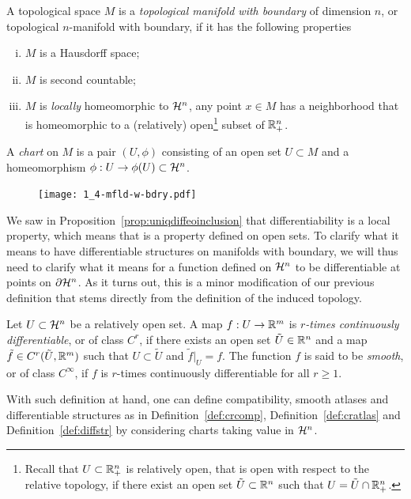 \begin{definition}
  A topological space $M$ is a \emph{topological manifold with boundary} of dimension $n$, or topological $n$-manifold with boundary, if it has the following properties
  \begin{enumerate}[(i)]
    \item $M$ is a Hausdorff space;
    \item $M$ is second countable;
    \item $M$ is \emph{locally} homeomorphic to $\mathcal{H}^n$, any point $x\in M$ has a neighborhood that is homeomorphic to a (relatively) open\footnote{Recall that $U\subset\mathbb{R}^n_+$ is relatively open, that is open with respect to the relative topology, if there exist an open set $\tilde U\subset\mathbb{R}^n$ such that $U = \tilde U \cap \mathbb{R}^n_+$.} subset of $\mathbb{R}^n_+$.
  \end{enumerate}

  A \emph{chart} on $M$ is a pair $(U, \phi)$ consisting of an open set $U\subset M$ and a homeomorphism $\phi: U \to \phi(U)\subset \mathcal{H}^n$.
\end{definition}

\begin{figure}
  \texttt{[image: 1\_4-mfld-w-bdry.pdf]}
\end{figure}

We saw in Proposition~\ref{prop:uniqdiffeoinclusion} that differentiability is a local property, which means that is a property defined on open sets.
To clarify what it means to have differentiable structures on manifolds with boundary, we will thus need to clarify what it means for a function defined on $\mathcal{H}^n$ to be differentiable at points on $\partial\mathcal{H}^n$.
As it turns out, this is a minor modification of our previous definition that stems directly from the definition of the induced topology.

\begin{definition}
  Let $U\subset\mathcal{H}^n$ be a relatively open set. A map $f: U\to\mathbb{R}^m$ is \emph{$r$-times continuously differentiable}, or of class $C^r$, if there exists an open set $\tilde U\in\mathbb{R}^n$ and a map $\tilde f\in C^r(\tilde U, \mathbb{R}^m)$ such that $U\subset\tilde U$ and $\tilde f|_U = f$.
  The function $f$ is said to be \emph{smooth}, or of class $C^\infty$, if $f$ is $r$-times continuously differentiable for all $r\geq 1$.
\end{definition}

With such definition at hand, one can define compatibility, smooth atlases and differentiable structures as in Definition~\ref{def:crcomp}, Definition~\ref{def:cratlas} and Definition~\ref{def:diffstr} by considering charts taking value in $\mathcal{H}^n$.

